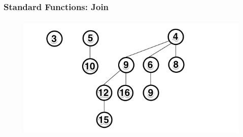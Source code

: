 \documentclass[13pt]{beamer}
\begin{document}
\begin{frame}
\frametitle{Standard Functions: Join}

  \begin{figure}
    \includegraphics[height=6cm]{./img/postjoin.png}
  \end{figure}

\end{frame}
\end{document}
